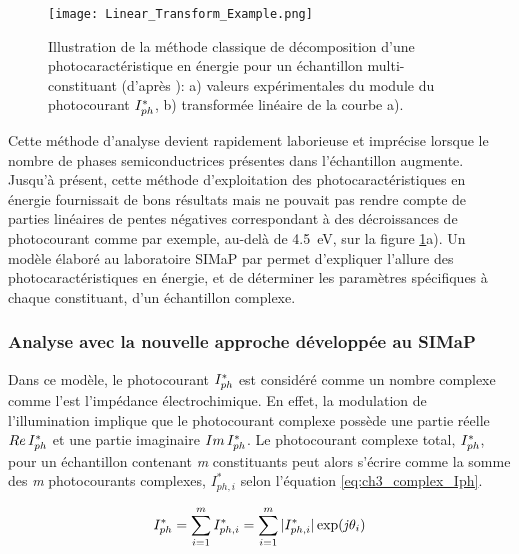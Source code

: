 \begin{refsection}
    \begin{figure}[H]
        \centering
        \texttt{[image: Linear\_Transform\_Example.png]}
        \caption[Illustration de la méthode classique de décomposition d'une photocaractéristique en énergie avec un échantillon
        multi-constituant:
            a) valeurs expérimentales du module du photocourant $\ipht$,
            b) transformée linéaire de la courbe a).]
        {Illustration de la méthode classique de décomposition d'une photocaractéristique en énergie pour un échantillon
            multi-constituant (d'après \citet{Petit2013}):
        a) valeurs expérimentales du module du photocourant $\ipht$,
        b) transformée linéaire de la courbe a).}
        \label{fig:ch3_linear_transform_PEC}
    \end{figure}
       
    Cette méthode d’analyse devient rapidement laborieuse et imprécise lorsque le nombre
    de phases semiconductrices présentes dans l’échantillon augmente. 
    Jusqu'à présent, cette méthode d'exploitation des photocaractéristiques en énergie fournissait de bons résultats mais
    ne pouvait pas rendre compte de parties linéaires de pentes négatives correspondant à des décroissances de photocourant
    comme par exemple, au-delà de \SI{4.5}{\electronvolt}, sur la figure \ref{fig:ch3_linear_transform_PEC}a).
    Un modèle élaboré au laboratoire  SIMaP par \citet{Petit2013} permet d’expliquer l'allure des photocaractéristiques
    en énergie, et de déterminer les paramètres spécifiques à chaque constituant, d'un échantillon complexe.

    \subsubsection{Analyse avec la nouvelle approche développée au SIMaP}\label{subsubsec:ch3_complex_sum}

    Dans ce modèle, le photocourant $I_{ph}^{\ast}$ est considéré comme un nombre complexe comme l'est l'impédance
    électrochimique. En effet, la modulation de l'illumination implique que le photocourant complexe possède une partie
    réelle $Re \, I_{ph}^{\ast}$ et une partie imaginaire $Im \, I_{ph}^{\ast}$. Le photocourant complexe total, $I_{ph}^{\ast}$, pour un échantillon
    contenant \emph{m} constituants peut alors s'écrire comme la somme des \emph{m} photocourants complexes, $I_{ph,i}^{\ast}$
    selon l'équation \ref{eq:ch3_complex_Iph}. 

    \begin{equation}
        I_{ph}^{\ast} = \sum _{i=1}^{m} I_{ph,i}^{\ast} = \sum _{i=1}^{m} \vert I_{ph,i}^{\ast} \vert \exp(\mathit{j}\theta _i)
        \label{eq:ch3_complex_Iph}
    \end{equation}


\end{refsection}
